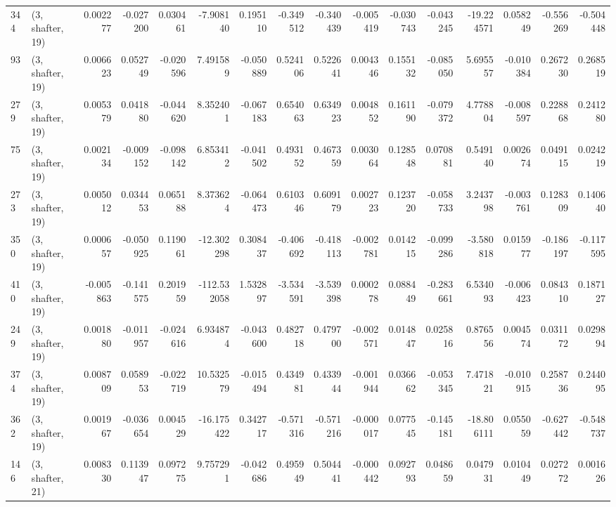 \begin{tabular}{llrrrrrrrrrrrrrr}
344 &  (3, shafter, 19) &   0.002277 & -0.027200 &  0.030461 &   -7.908140 &  0.195110 &  -0.349512 & -0.340439 & -0.005419 & -0.030743 & -0.043245 &  -19.224571 &  0.058249 & -0.556269 & -0.504448 \\
93  &  (3, shafter, 19) &   0.006623 &  0.052749 & -0.020596 &    7.491589 & -0.050889 &   0.524106 &  0.522641 &  0.004346 &  0.155132 & -0.085050 &    5.695557 & -0.010384 &  0.267230 &  0.268519 \\
279 &  (3, shafter, 19) &   0.005379 &  0.041880 & -0.044620 &    8.352401 & -0.067183 &   0.654063 &  0.634923 &  0.004852 &  0.161190 & -0.079372 &    4.778804 & -0.008597 &  0.228868 &  0.241280 \\
75  &  (3, shafter, 19) &   0.002134 & -0.009152 & -0.098142 &    6.853412 & -0.041502 &   0.493152 &  0.467359 &  0.003064 &  0.128548 &  0.070881 &    0.549140 &  0.002674 &  0.049115 &  0.024219 \\
273 &  (3, shafter, 19) &   0.005012 &  0.034453 &  0.065188 &    8.373624 & -0.064473 &   0.610346 &  0.609179 &  0.002723 &  0.123720 & -0.058733 &    3.243798 & -0.003761 &  0.128309 &  0.140640 \\
350 &  (3, shafter, 19) &   0.000657 & -0.050925 &  0.119061 &  -12.302298 &  0.308437 &  -0.406692 & -0.418113 & -0.002781 &  0.014215 & -0.099286 &   -3.580818 &  0.015977 & -0.186197 & -0.117595 \\
410 &  (3, shafter, 19) &  -0.005863 & -0.141575 &  0.201959 & -112.532058 &  1.532897 &  -3.534591 & -3.539398 &  0.000278 &  0.088449 & -0.283661 &    6.534093 & -0.006423 &  0.084310 &  0.187127 \\
249 &  (3, shafter, 19) &   0.001880 & -0.011957 & -0.024616 &    6.934874 & -0.043600 &   0.482718 &  0.479700 & -0.002571 &  0.014847 &  0.025816 &    0.876556 &  0.004574 &  0.031172 &  0.029894 \\
374 &  (3, shafter, 19) &   0.008709 &  0.058953 & -0.022719 &   10.532579 & -0.015494 &   0.434981 &  0.433944 & -0.001944 &  0.036662 & -0.053345 &    7.471821 & -0.010915 &  0.258736 &  0.244095 \\
362 &  (3, shafter, 19) &   0.001967 & -0.036654 &  0.004529 &  -16.175422 &  0.342717 &  -0.571316 & -0.571216 & -0.000017 &  0.077545 & -0.145181 &  -18.806111 &  0.055059 & -0.627442 & -0.548737 \\
146 &  (3, shafter, 21) &   0.008330 &  0.113947 &  0.097275 &    9.757291 & -0.042686 &   0.495949 &  0.504441 & -0.000442 &  0.092793 &  0.048659 &    0.047931 &  0.010449 &  0.027272 &  0.001626 \\

\end{tabular}
